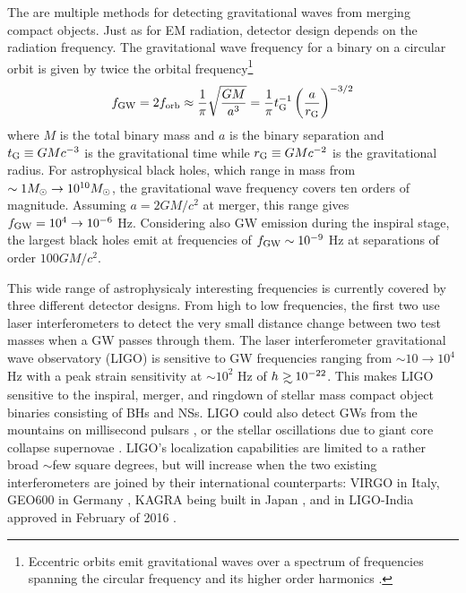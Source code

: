 The are multiple methods for detecting gravitational waves from merging
compact objects. Just as for EM radiation, detector design depends on the
radiation frequency. The gravitational wave frequency for a binary on a
circular orbit is given by twice the orbital frequency\footnote{Eccentric
orbits emit gravitational waves over a spectrum of frequencies spanning the
circular frequency and its higher order harmonics \citep{}.} \begin{equation}
f_{\rm{GW}} = 2 f_{\rm{orb}} \approx  \frac{1}{\pi} \sqrt{\frac{G M }{a^3}} =
\frac{1}{\pi} t^{-1}_{\rm{G}} \left( \frac{a}{r_{\rm{G}}} \right)^{-3/2}
\end{equation} where $M$ is the total binary mass and $a$ is the binary
separation and $t_{\rm{G}} \equiv GMc^{-3}$ is the gravitational time while
$r_{\rm{G}} \equiv GMc^{-2}$ is the gravitational radius.  For astrophysical
black holes, which range in mass from $\sim 1 {M_{\odot}} \rightarrow 10^{10}
{M_{\odot}}$, the gravitational wave frequency covers ten orders of magnitude.
Assuming $a = 2GM/c^2$ at merger, this range gives $f_{\rm{GW}} = 10^4 \rightarrow
10^{-6}$ Hz. Considering also GW emission during the inspiral stage, the
largest black holes emit at frequencies of $f_{\rm{GW}} \sim 10^{-9}$ Hz at
separations of order $100 GM/c^2$.

This wide range of astrophysicaly interesting frequencies is currently covered
by three different detector designs. From high to low frequencies, the first
two use laser interferometers to detect the very small distance change between
two test masses when a GW passes through them. The laser interferometer
gravitational wave observatory (LIGO) is sensitive to GW frequencies ranging
from $\sim 10 \rightarrow 10^4$ Hz with a peak strain sensitivity at
$\sim10^{2}$ Hz of $h \gsim 10^{-22}$. This makes LIGO sensitive to the
inspiral, merger, and ringdown of stellar mass compact object binaries
consisting of BHs and NSs. LIGO could also detect GWs from the mountains on
millisecond pulsars \citep{}, or the stellar oscillations due to giant core
collapse supernovae \citep{}. LIGO's localization capabilities are limited to
a rather broad $\sim$few square degrees, but will increase when the two
existing interferometers are joined by their international counterparts: VIRGO
\citep{} in Italy, GEO600 in Germany \citep{}, KAGRA being built in Japan
\citep{}, and in LIGO-India approved in February of 2016 \citep{}.

